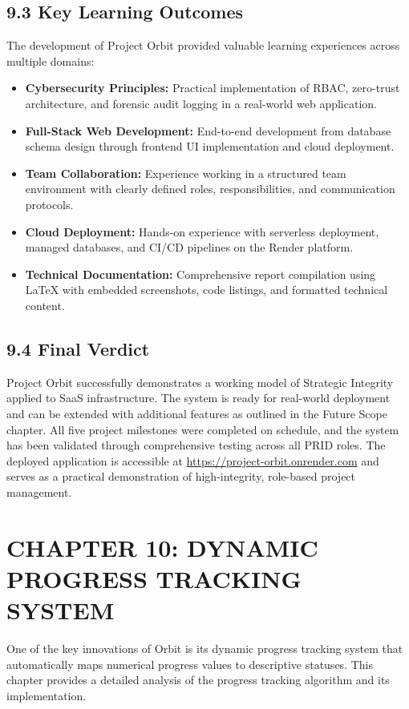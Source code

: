 ﻿\documentclass[12pt]{article}
\def\normaltext{\fontsize{12pt}{18pt}\color{secondary}}
\begin{document}
\subsection*{9.3 Key Learning Outcomes}
The development of Project Orbit provided valuable learning experiences across multiple domains:
\begin{itemize}
\item \textbf{Cybersecurity Principles:} Practical implementation of RBAC, zero-trust architecture, and forensic audit logging in a real-world web application.
\item \textbf{Full-Stack Web Development:} End-to-end development from database schema design through frontend UI implementation and cloud deployment.
\item \textbf{Team Collaboration:} Experience working in a structured team environment with clearly defined roles, responsibilities, and communication protocols.
\item \textbf{Cloud Deployment:} Hands-on experience with serverless deployment, managed databases, and CI/CD pipelines on the Render platform.
\item \textbf{Technical Documentation:} Comprehensive report compilation using LaTeX with embedded screenshots, code listings, and formatted technical content.
\end{itemize}

\subsection*{9.4 Final Verdict}
Project Orbit successfully demonstrates a working model of Strategic Integrity applied to SaaS infrastructure. The system is ready for real-world deployment and can be extended with additional features as outlined in the Future Scope chapter. All five project milestones were completed on schedule, and the system has been validated through comprehensive testing across all PRID roles. The deployed application is accessible at \url{https://project-orbit.onrender.com} and serves as a practical demonstration of high-integrity, role-based project management.
\newpage

\section*{{\color{primary}CHAPTER 10: DYNAMIC PROGRESS TRACKING SYSTEM}}
\normaltext
One of the key innovations of Orbit is its dynamic progress tracking system that automatically maps numerical progress values to descriptive statuses. This chapter provides a detailed analysis of the progress tracking algorithm and its implementation.
\end{document}
